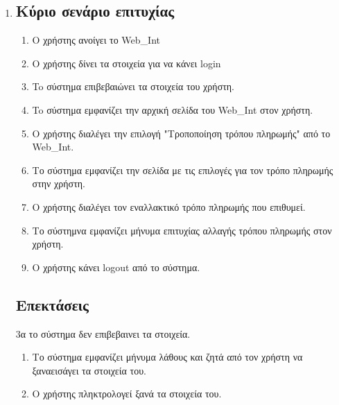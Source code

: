 \documentclass[12pt]{article}
\begin{document}
\begin{enumerate}
\item
\subsection*{Κύριο σενάριο επιτυχίας}
\begin{enumerate}[label=\arabic*.]
\item
Ο χρήστης ανοίγει το \textlatin{Web\_Int}
\item
Ο χρήστης δίνει τα στοιχεία για να κάνει \textlatin{login}
\item
To σύστημα επιβεβαιώνει τα στοιχεία του χρήστη.
\item
To σύστημα εμφανίζει την αρχική σελίδα του \textlatin{Web\_Int} στον χρήστη.
\item
Ο χρήστης διαλέγει την επιλογή "Τροποποίηση τρόπου πληρωμής" 
από το \textlatin{Web\_Int}.
\item
Το σύστημα εμφανίζει την σελίδα με τις επιλογές για τον τρόπο 
πληρωμής στην χρήστη.
\item
Ο χρήστης διαλέγει τον εναλλακτικό τρόπο πληρωμής που επιθυμεί.
\item
Το σύστημνα εμφανίζει μήνυμα επιτυχίας αλλαγής τρόπου πληρωμής 
στον χρήστη.
\item
Ο χρήστης κάνει \textlatin{logout} από το σύστημα.
\end{enumerate}

\subsection*{Επεκτάσεις}
3α το σύστημα δεν επιβεβαινει τα στοιχεία.
\begin{enumerate}[label=\arabic*.]
\item
Το σύστημα εμφανίζει μήνυμα λάθους και ζητά από τον 
χρήστη να ξαναεισάγει τα στοιχεία του.
\item 
Ο χρήστης πληκτρολογεί ξανά τα στοιχεία του.
\end{enumerate}


\end{enumerate}
\end{document}
